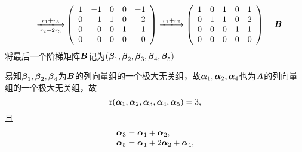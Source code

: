 \begin{frame}\ft{\subsecname}
  
  $$
  \begin{array}{rl}
    & \xlongrightarrow[r_2 -2 r_3]{r_1+r_3}
      \left(
      \begin{array}{rrrrr}
        1&-1&0&0&-1\\
        0&1&1&0&2\\
        0&0&0&1&1\\
        0&0&0&0&0
      \end{array}
                 \right) \xlongrightarrow[]{r_1+r_2}
                 \left(
                 \begin{array}{rrrrr}
                   1&0&1&0&1\\
                   0&1&1&0&2\\
                   0&0&0&1&1\\
                   0&0&0&0&0
                 \end{array}
                            \right) = \MB
  \end{array}
  $$
  将最后一个阶梯矩阵$\boldsymbol{B}$记为$(\boldsymbol{\beta}_1,\boldsymbol{\beta}_2,\boldsymbol{\beta}_3,\boldsymbol{\beta}_4,\boldsymbol{\beta}_5)$
  \pause 
  \vspace{0.1in}

  易知$\boldsymbol{\beta}_1,\boldsymbol{\beta}_2,\boldsymbol{\beta}_4$为$\boldsymbol{B}$的列向量组的一个极大无关组，故$\boldsymbol{\alpha}_1,\boldsymbol{\alpha}_2,\boldsymbol{\alpha}_4$也为$\boldsymbol{A}$的列向量组的一个极大无关组，故
  $$
  \mathrm{r}(\boldsymbol{\alpha}_1,\boldsymbol{\alpha}_2,\boldsymbol{\alpha}_3,\boldsymbol{\alpha}_4,\boldsymbol{\alpha}_5)=3,
  $$
  且
  $$
  \begin{array}{l}
    \boldsymbol{\alpha}_3=\boldsymbol{\alpha}_1+\boldsymbol{\alpha}_2,\\
    \boldsymbol{\alpha}_5=\boldsymbol{\alpha}_1+2\boldsymbol{\alpha}_2+\boldsymbol{\alpha}_4,\\
  \end{array}
  $$
  
  
\end{frame}




